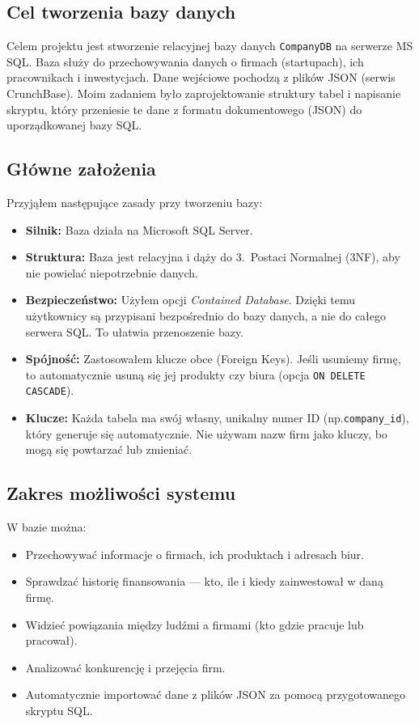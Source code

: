 \documentclass[12pt,a4paper]{article}
\begin{document}
\subsection{Cel tworzenia bazy danych}

Celem projektu jest stworzenie relacyjnej bazy danych \texttt{CompanyDB} na serwerze MS SQL. Baza służy do przechowywania danych o firmach (startupach), ich pracownikach i inwestycjach. Dane wejściowe pochodzą z plików JSON (serwis CrunchBase). Moim zadaniem było zaprojektowanie struktury tabel i napisanie skryptu, który przeniesie te dane z formatu dokumentowego (JSON) do uporządkowanej bazy SQL.

\subsection{Główne założenia}

Przyjąłem następujące zasady przy tworzeniu bazy:

\begin{itemize}[noitemsep]
    \item \textbf{Silnik:} Baza działa na Microsoft SQL Server.
    \item \textbf{Struktura:} Baza jest relacyjna i dąży do 3.~Postaci Normalnej (3NF), aby nie powielać niepotrzebnie danych.
    \item \textbf{Bezpieczeństwo:} Użyłem opcji \textit{Contained Database}. Dzięki temu użytkownicy są przypisani bezpośrednio do bazy danych, a nie do całego serwera SQL. To ułatwia przenoszenie bazy.
    \item \textbf{Spójność:} Zastosowałem klucze obce (Foreign Keys). Jeśli usuniemy firmę, to automatycznie usuną się jej produkty czy biura (opcja \texttt{ON DELETE CASCADE}).
    \item \textbf{Klucze:} Każda tabela ma swój własny, unikalny numer ID (np.\@ \texttt{company\_id}), który generuje się automatycznie. Nie używam nazw firm jako kluczy, bo mogą się powtarzać lub zmieniać.
\end{itemize}

\subsection{Zakres możliwości systemu}

W bazie można:

\begin{itemize}[noitemsep]
    \item Przechowywać informacje o firmach, ich produktach i adresach biur.
    \item Sprawdzać historię finansowania --- kto, ile i kiedy zainwestował w daną firmę.
    \item Widzieć powiązania między ludźmi a firmami (kto gdzie pracuje lub pracował).
    \item Analizować konkurencję i przejęcia firm.
    \item Automatycznie importować dane z plików JSON za pomocą przygotowanego skryptu SQL.
\end{itemize}
\end{document}
